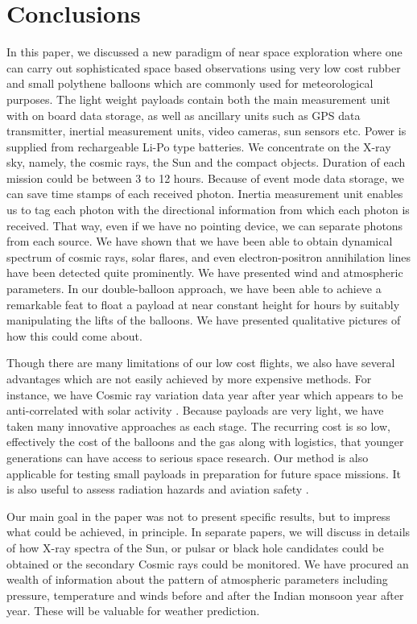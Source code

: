 \section{Conclusions}
\label{sec:conc}
In this paper, we discussed a new paradigm of near space exploration 
where one can carry out sophisticated space based observations using very low cost 
rubber and small polythene  balloons which are commonly used for meteorological purposes.  
The light weight payloads  contain both the main measurement unit with on board data
storage, as well as ancillary units such as GPS data transmitter, inertial measurement units, 
video cameras, sun sensors etc. Power is supplied from rechargeable Li-Po type batteries. We
concentrate on the X-ray sky, namely, the cosmic rays, the Sun and the compact objects.
Duration of each mission could be between 3 to 12 hours. Because of event mode data storage, 
we can save time stamps of each received photon. Inertia measurement unit enables us to tag each photon
with the directional information from which each photon is received. 
That way, even if we have no 
pointing device, we can separate photons from each source. 
We have shown that we have been able to obtain dynamical spectrum of  cosmic rays, solar flares, 
and even electron-positron annihilation lines have been detected quite prominently. We 
have presented wind and atmospheric parameters. In our double-balloon approach, we have been able to 
achieve a remarkable feat to float a payload at near constant height for hours by suitably 
manipulating the lifts of the balloons. We have presented qualitative pictures of how this
could come about.

Though there are many limitations of our low cost flights, we also have several advantages
which are not easily achieved by more expensive methods. For instance, we have 
Cosmic ray variation data year after year which appears to be anti-correlated
with solar activity \citep{sark17}. 
Because payloads are very light, we have taken many innovative 
approaches as each stage. The recurring cost is so low, effectively the cost of the 
balloons and the gas along with logistics, that younger generations can have access to 
serious space research. Our method is also applicable for testing small payloads
in preparation for future space missions. 
It is also useful to assess radiation hazards and aviation safety
\citep{miro03,icsp}.

Our main goal in the paper was not to present specific results, but to impress what could be
achieved, in principle. In separate papers, we will discuss in details of how X-ray spectra
of the Sun, or pulsar or black hole candidates could be obtained or the secondary Cosmic rays
could be monitored. We have procured an wealth of information about the pattern of atmospheric
parameters including pressure, temperature and winds before and after the Indian monsoon year
after year. These will be valuable for weather prediction. 


